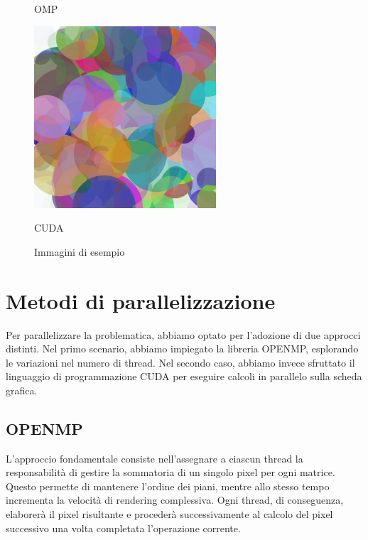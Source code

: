 \documentclass[11pt]{article}
\begin{document}
\begin{figure}[h!]
\begin{minipage}{0.32\textwidth}
            \caption{OMP}
        \end{minipage}%
        \hfill
        \begin{minipage}{0.32\textwidth}
            \centering
            \includegraphics[width=\textwidth]{img/cuda/10000}
            \caption{CUDA}
        \end{minipage}
        \caption{Immagini di esempio}\label{fig:example-images}
    \end{figure}

    \section{Metodi di parallelizzazione}\label{sec:metodi-di-parallelizazzione}

    Per parallelizzare la problematica, abbiamo optato per l'adozione di due approcci distinti.
    Nel primo scenario, abbiamo impiegato la libreria OPENMP, esplorando le variazioni nel numero di thread.
    Nel secondo caso, abbiamo invece sfruttato il linguaggio di programmazione CUDA per eseguire calcoli in parallelo sulla scheda grafica.
    

    \subsection{OPENMP}\label{subsec:openmp}
    L'approccio fondamentale consiste nell'assegnare a ciascun thread la responsabilità di gestire la sommatoria di un
    singolo pixel per ogni matrice.
    Questo permette di mantenere l'ordine dei piani, mentre allo stesso tempo incrementa la velocità di rendering complessiva.
    Ogni thread, di conseguenza, elaborerà il pixel risultante e procederà successivamente al calcolo del pixel successivo
    una volta completata l'operazione corrente.
    
\end{document}

